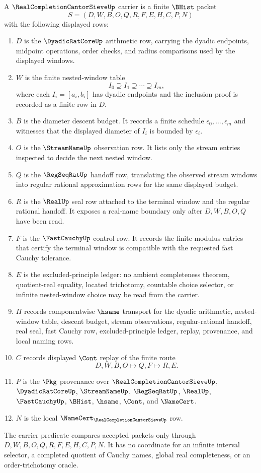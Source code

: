 \begin{definition}
\label{def:real-completion-cantor-sieve-carrier}
A $\RealCompletionCantorSieveUp$ carrier is a finite $\BHist$ packet
$$
S=(D,W,B,O,Q,R,F,E,H,C,P,N)
$$
with the following displayed rows:
\begin{enumerate}
\item $D$ is the $\DyadicRatCoreUp$ arithmetic row, carrying the dyadic endpoints, midpoint operations, order checks, and radius comparisons used by the displayed windows.
\item $W$ is the finite nested-window table
$$
I_0 \supseteq I_1 \supseteq \cdots \supseteq I_m,
$$
where each $I_i=[a_i,b_i]$ has dyadic endpoints and the inclusion proof is recorded as a finite row in $D$.
\item $B$ is the diameter descent budget. It records a finite schedule $\epsilon_0,\ldots,\epsilon_m$ and witnesses that the displayed diameter of $I_i$ is bounded by $\epsilon_i$.
\item $O$ is the $\StreamNameUp$ observation row. It lists only the stream entries inspected to decide the next nested window.
\item $Q$ is the $\RegSeqRatUp$ handoff row, translating the observed stream windows into regular rational approximation rows for the same displayed budget.
\item $R$ is the $\RealUp$ seal row attached to the terminal window and the regular rational handoff. It exposes a real-name boundary only after $D,W,B,O,Q$ have been read.
\item $F$ is the $\FastCauchyUp$ control row. It records the finite modulus entries that certify the terminal window is compatible with the requested fast Cauchy tolerance.
\item $E$ is the excluded-principle ledger: no ambient completeness theorem, quotient-real equality, located trichotomy, countable choice selector, or infinite nested-window choice may be read from the carrier.
\item $H$ records componentwise $\hsame$ transport for the dyadic arithmetic, nested-window table, descent budget, stream observations, regular-rational handoff, real seal, fast Cauchy row, excluded-principle ledger, replay, provenance, and local naming rows.
\item $C$ records displayed $\Cont$ replay of the finite route
$$
D,W,B,O \longmapsto Q,F \longmapsto R,E .
$$
\item $P$ is the $\Pkg$ provenance over $\RealCompletionCantorSieveUp$, $\DyadicRatCoreUp$, $\StreamNameUp$, $\RegSeqRatUp$, $\RealUp$, $\FastCauchyUp$, $\BHist$, $\hsame$, $\Cont$, and $\NameCert$.
\item $N$ is the local $\NameCert_{\RealCompletionCantorSieveUp}$ row.
\end{enumerate}
The carrier predicate compares accepted packets only through $D,W,B,O,Q,R,F,E,H,C,P,N$. It has no coordinate for an infinite interval selector, a completed quotient of Cauchy names, global real completeness, or an order-trichotomy oracle.
\end{definition}

